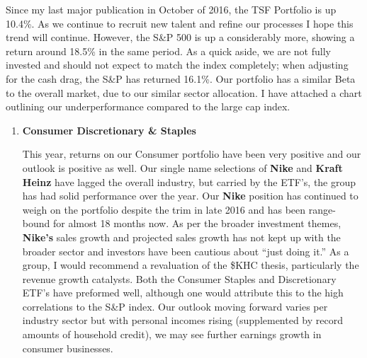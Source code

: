 \documentclass[11pt,pressrelease]{newlfm} %
\begin{document}
\begin{newlfm}


\begin{singlespace} %
Since my last major publication in October of 2016, the TSF Portfolio is up 10.4\%. As we continue to recruit new talent and refine our processes I hope this trend will continue. However, the S\&P 500 is up a considerably more, showing a return around 18.5\% in the same period. As a quick aside, we are not fully invested and should not expect to match the index completely; when adjusting for the cash drag, the S\&P has returned 16.1\%. Our portfolio has a similar Beta to the overall market, due to our similar sector allocation. I have attached a chart outlining our underperformance compared to the large cap index. %

\begin{enumerate}
\item \textbf{Consumer Discretionary \& Staples} \par
This year, returns on our Consumer portfolio have been very positive and our outlook is positive as well. Our single name selections of \textbf{Nike} and \textbf{Kraft Heinz} have lagged the overall industry, but carried by the ETF's, the group has had solid performance over the year. Our \textbf{Nike} position has continued to weigh on the portfolio despite the trim in late 2016 and has been range-bound for almost 18 months now. As per the broader investment themes, \textbf{Nike's} sales growth and projected sales growth has not kept up with the broader sector and investors have been cautious about ``just doing it.'' As a group, I would recommend a revaluation of the \$KHC thesis, particularly the revenue growth catalysts. Both the Consumer Staples and Discretionary ETF’s have preformed well, although one would attribute this to the high correlations to the S\&P index. Our outlook moving forward varies per industry sector but with personal incomes rising (supplemented by record amounts of household credit), we may see further earnings growth in consumer businesses. %


\end{enumerate}
\end{singlespace}
\end{newlfm}
\end{document}

